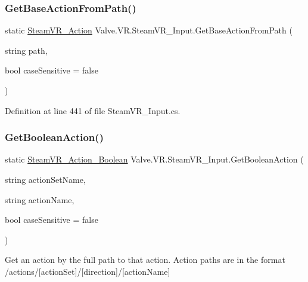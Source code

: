\subsubsection{\texorpdfstring{GetBaseActionFromPath()}{GetBaseActionFromPath()}}
{\footnotesize\ttfamily static \mbox{\hyperlink{class_valve_1_1_v_r_1_1_steam_v_r___action}{Steam\+V\+R\+\_\+\+Action}} Valve.\+V\+R.\+Steam\+V\+R\+\_\+\+Input.\+Get\+Base\+Action\+From\+Path (\begin{DoxyParamCaption}\item[{string}]{path,  }\item[{bool}]{case\+Sensitive = {\ttfamily false} }\end{DoxyParamCaption})\hspace{0.3cm}{\ttfamily [static]}}



Definition at line 441 of file Steam\+V\+R\+\_\+\+Input.\+cs.

\mbox{\label{class_valve_1_1_v_r_1_1_steam_v_r___input_a1442b5592282c75d7caeb91fe3509124}} 
\subsubsection{\texorpdfstring{GetBooleanAction()}{GetBooleanAction()}\hspace{0.1cm}{\footnotesize\ttfamily [1/2]}}
{\footnotesize\ttfamily static \mbox{\hyperlink{class_valve_1_1_v_r_1_1_steam_v_r___action___boolean}{Steam\+V\+R\+\_\+\+Action\+\_\+\+Boolean}} Valve.\+V\+R.\+Steam\+V\+R\+\_\+\+Input.\+Get\+Boolean\+Action (\begin{DoxyParamCaption}\item[{string}]{action\+Set\+Name,  }\item[{string}]{action\+Name,  }\item[{bool}]{case\+Sensitive = {\ttfamily false} }\end{DoxyParamCaption})\hspace{0.3cm}{\ttfamily [static]}}



Get an action by the full path to that action. Action paths are in the format /actions/\mbox{[}action\+Set\mbox{]}/\mbox{[}direction\mbox{]}/\mbox{[}action\+Name\mbox{]} 


